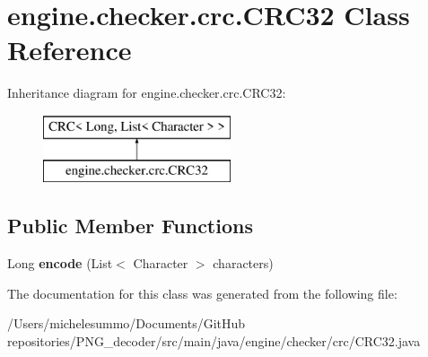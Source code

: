 \hypertarget{classengine_1_1checker_1_1crc_1_1_c_r_c32}{\section{engine.\-checker.\-crc.\-C\-R\-C32 Class Reference}
\label{classengine_1_1checker_1_1crc_1_1_c_r_c32}
}
Inheritance diagram for engine.\-checker.\-crc.\-C\-R\-C32\-:\begin{figure}[H]
\begin{center}
\leavevmode
\includegraphics[height=2.000000cm]{classengine_1_1checker_1_1crc_1_1_c_r_c32}
\end{center}
\end{figure}
\subsection*{Public Member Functions}
\begin{DoxyCompactItemize}
\item 
\hypertarget{classengine_1_1checker_1_1crc_1_1_c_r_c32_a37307cfe23d0952ed53cda900209e2ca}{Long {\bfseries encode} (List$<$ Character $>$ characters)}\label{classengine_1_1checker_1_1crc_1_1_c_r_c32_a37307cfe23d0952ed53cda900209e2ca}

\end{DoxyCompactItemize}


The documentation for this class was generated from the following file\-:\begin{DoxyCompactItemize}
\item 
/\-Users/michelesummo/\-Documents/\-Git\-Hub repositories/\-P\-N\-G\-\_\-decoder/src/main/java/engine/checker/crc/C\-R\-C32.\-java\end{DoxyCompactItemize}
